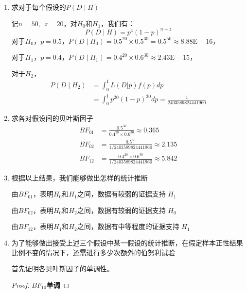 \documentclass[stu,12pt,floatsintext]{apa7} %
\begin{document}
\begin{enumerate}[itemsep=2pt,topsep=0pt,parsep=0pt,label=(\alph*)]

    \item 求对于每个假设的\(P(D \mid H)\)
    
    记\(n = 50,\ \ z = 20\)，对\(H_0\)和\(H_1\)，我们有：
    \setlength\abovedisplayskip{0.7em}
    \setlength\belowdisplayskip{0.7em}  
    \[
    P(D \mid H) =  p^z (1-p)^{n-z} 
    \]
    对于\(H_0\)，\(p = 0.5\)，\(P(D \mid H_0) = 0.5^{20} \times 0.5^{30} = 0.5^{50} \approx 8.88\text{E}-16\)，

    对于\(H_1\)，\(p = 0.4\)，\(P(D \mid H_1) = 0.4^{20} \times 0.6^{30}\approx 2.43\text{E}-15\)，

    对于\(H_2\)，
    \setlength\abovedisplayskip{0.7em}
    \setlength\belowdisplayskip{0.7em}
    \begin{align*}
        P(D \mid H_2) & = \int_{0}^{1} L(D|p)f(p)dp\\
         & = \int_0^1 p^{20} (1-p)^{30} dp = \frac{1}{2403589824441960}
    \end{align*}

    \item 求各对假设间的贝叶斯因子
    \setlength\abovedisplayskip{0.7em}
    \setlength\belowdisplayskip{0.7em}
    \begin{align*}
        BF_{01} & = \frac{0.5^{50}}{0.4^{20} \times 0.6^{30}} \approx 0.365\\
        BF_{02} & = \frac{0.5^{50}}{1/2403589824441960} \approx 2.135\\
        BF_{12} & = \frac{0.4^{20} \times 0.6^{30}}{1/2403589824441960} \approx 5.842
    \end{align*}

    \item 根据以上结果，我们能够做出怎样的统计推断
    
    由\(BF_{01}\)，表明$H_0$和$H_1$之间，数据有较弱的证据支持 \(H_1\) 

    由\(BF_{02}\)，表明$H_0$和$H_2$之间，数据有较弱的证据支持 \(H_0\)

    由\(BF_{12}\)，表明$H_1$和$H_2$之间，数据有中等程度的证据支持 \(H_1\) 

    \item 为了能够做出接受上述三个假设中某一假设的统计推断，在假定样本正性结果比例不变的情况下，还需进行多少次额外的伯努利试验
    
    首先证明各贝叶斯因子的单调性。
    \begin{proof}\textbf{\(BF_{10}\)单调}
    

\end{proof}
\end{enumerate}
\end{document}
